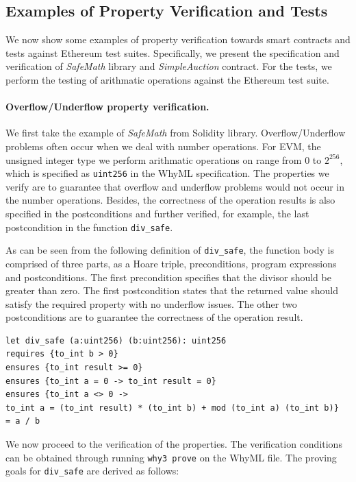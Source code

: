 \documentclass[runningheads]{llncs}
\begin{document}
\subsection{Examples of Property Verification and Tests}

We now show some examples of property verification towards smart contracts and tests against Ethereum 
test suites. Specifically, we present the specification and verification of \emph{SafeMath} library and \emph{SimpleAuction} contract.
For the tests, we perform the testing of arithmatic operations against the Ethereum test suite.

\paragraph{Overflow/Underflow property verification.}
We first take the example of \emph{SafeMath} from Solidity 
library. Overflow/Underflow problems often occur when we deal with number operations. For EVM, the unsigned integer type we 
perform arithmatic operations on range from 0 to $2^{256}$, which is specified as \texttt{uint256} in the WhyML specification.
The properties we verify are to guarantee that overflow and underflow problems would not occur in the number operations.
Besides, the correctness of the operation results is also specified in the postconditions and further verified, for example,
the last postcondition in the function \texttt{div\_safe}. 

As can be seen from the following definition of \texttt{div\_safe},
the function body is comprised of three parts, as a Hoare triple, 
preconditions, program expressions and postconditions.
The first precondition specifies that the divisor should be greater than
zero. The first postcondition states that the returned value should
satisfy the required property with no underflow issues. The other
two postconditions are to guarantee the correctness of the operation result. 
\begin{verbatim}
let div_safe (a:uint256) (b:uint256): uint256
requires {to_int b > 0}
ensures {to_int result >= 0}
ensures {to_int a = 0 -> to_int result = 0}
ensures {to_int a <> 0 -> 
to_int a = (to_int result) * (to_int b) + mod (to_int a) (to_int b)}
= a / b
\end{verbatim}

We now proceed to the verification of the properties. The verification conditions can be obtained 
through running \texttt{why3 prove} on the WhyML file. 
The proving goals for \texttt{div\_safe} are derived as follows:
\end{document}
